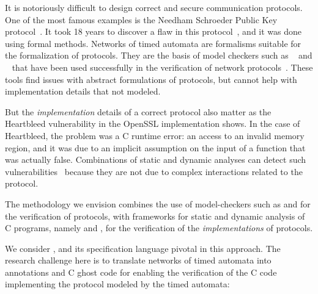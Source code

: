 It is notoriously difficult to design correct and secure communication protocols.
One of the most famous examples is the Needham Schroeder Public Key protocol~\cite{NS1978:CACM}.
It took 18 years to discover a flaw in this protocol~\cite{LOW1996:TACAS}, and it was done using formal methods.
Networks of timed automata are formalisms suitable for the formalization of protocols.
They are the basis of model checkers such as \uppaal~\cite{DLL2015:STTT} and \prism~\cite{KNP2011:CAV} that have been used successfully in the verification of network protocols~\cite{ZBW2013:ENTCS,HMJ2006:MASCOTS,HSS2010:NFM,KPK2015:VECOS}.
These tools find issues with abstract formulations of protocols, but cannot help with implementation details that not modeled.

But the {\em implementation} details of a correct protocol also matter as the Heartbleed vulnerability in the OpenSSL implementation shows.
In the case of Heartbleed, the problem was a C runtime error: an access to an invalid memory region, and it was due to an implicit assumption on the input of a function that was actually false.
Combinations of static and dynamic analyses can detect such vulnerabilities~\cite{KKP2015:HVC} because they are not due to complex interactions related to the protocol.

The methodology we envision combines the use of model-checkers such as \uppaal and \prism for the verification of protocols, with frameworks for static and dynamic analysis of C programs, namely \framac and \deepstate, for the verification of the {\em implementations} of protocols.

We consider \framac, and its specification language \acsl pivotal in this approach.
The research challenge here is to translate networks of timed automata into \acsl annotations and C ghost code for enabling the verification of the C code implementing the protocol modeled by the timed automata:

